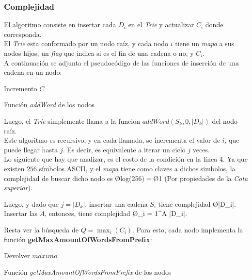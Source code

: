 \subsubsection{Complejidad}
El algoritmo consiste en insertar cada $D_i$ en el \emph{Trie} y actualizar $C_i$ donde corresponda.\\
El \emph{Trie} esta conformado por un nodo raíz, y cada nodo $i$ tiene un \emph{mapa} a sus nodos hijos, un \emph{flag} que indica si es el fin de una cadena o no, y $C_i$.\\
A continuación se adjunta el pseudocódigo de las funciones de inserción de una cadena en un nodo:\\
\begin{algorithm}[H]

	Incremento $C$

	\caption{Función \emph{addWord} de los nodos}
\end{algorithm}

Luego, el \emph{Trie} simplemente llama a la funcion $addWord(S_k, 0, |D_k|)$ del nodo raíz.\\
Este algoritmo es recursivo, y en cada llamada, se incrementa el valor de $i$, que puede llegar hasta $j$. Es decir, es equivalente a iterar un ciclo $j$ veces.\\
Lo siguiente que hay que analizar, es el costo de la condición en la línea 4. Ya que existen $256$ símbolos ASCII, y el \emph{mapa} tiene como claves a dichos simbolos, la complejidad de buscar dicho nodo es \O{log(256)}$=$\O{1} (Por propiedades de la \emph{Cota superior}).

Luego, y dado que $j = |D_k|$, insertar una cadena $S_i$ tiene complejidad \O{|D_i|}. Insertar las $A$, entonces, tiene complejidad \O{\displaystyle \sum_{i = 1}^{A} |D_i|}.

Resta ver la búsqueda de $\displaystyle Q = \operatorname*{max}_{i} (C_i)$. Para esto, cada nodo implementa la función \textbf{getMaxAmountOfWordsFromPrefix}:\\
\begin{algorithm}[H]

	Devolver $maximo$

	\caption{Función \emph{getMaxAmountOfWordsFromPrefix} de los nodos}
\end{algorithm}

